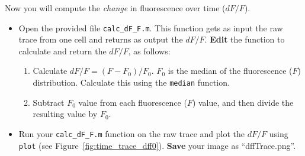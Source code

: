 \documentclass[paper=a4, fontsize=11pt]{article} %
\numberwithin{equation}{section} %
\numberwithin{figure}{section} %
\numberwithin{table}{section} %
\begin{document}
Now you will compute the \emph{change} in fluorescence over time ($dF/F$).
\begin{itemize}
\item Open the provided file \texttt{calc\_dF\_F.m}. This function gets as input the raw trace from one cell and returns as output the $dF/F$. \textbf{Edit} the function to calculate and return the $dF/F$, as follows:
  \begin{enumerate}
  \item Calculate $dF/F = (F-F_0)/F_0$. $F_0$ is the median of the fluorescence ($F$) distribution. Calculate this using the \texttt{median} function.
  \item Subtract $F_0$ value from each fluorescence ($F$) value, and then divide the resulting value by $F_0$.
  \end{enumerate}
\item Run your \texttt{calc\_dF\_F.m} function on the raw trace and plot the $dF/F$ using \texttt{plot} (see Figure~\ref{fig:time_trace_dff0}). \textbf{Save} your image as ``dffTrace.png''.
\end{itemize}
\end{document}
